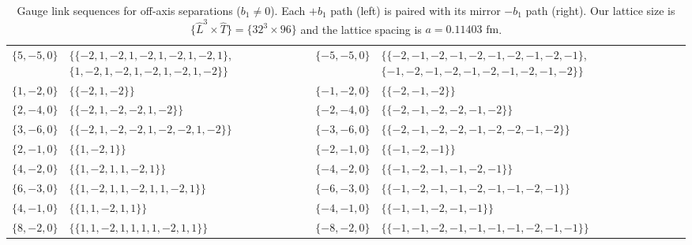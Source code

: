 \begin{table}[tb]
\begin{ruledtabular}
\begin{tabular}{llll}
$\{5,-5,0\}$ & \parbox[t]{0.32\textwidth}{\raggedright $\{$\mbox{$\{-2,1,-2,1,-2,1,-2,1,-2,1\}$}, \mbox{$\{1,-2,1,-2,1,-2,1,-2,1,-2\}$}$\}$} & $\{-5,-5,0\}$ & \parbox[t]{0.32\textwidth}{\raggedright $\{$\mbox{$\{-2,-1,-2,-1,-2,-1,-2,-1,-2,-1\}$}, \mbox{$\{-1,-2,-1,-2,-1,-2,-1,-2,-1,-2\}$}$\}$} \\
$\{1,-2,0\}$ & \parbox[t]{0.32\textwidth}{\raggedright $\{$\mbox{$\{-2,1,-2\}$}$\}$} & $\{-1,-2,0\}$ & \parbox[t]{0.32\textwidth}{\raggedright $\{$\mbox{$\{-2,-1,-2\}$}$\}$} \\
$\{2,-4,0\}$ & \parbox[t]{0.32\textwidth}{\raggedright $\{$\mbox{$\{-2,1,-2,-2,1,-2\}$}$\}$} & $\{-2,-4,0\}$ & \parbox[t]{0.32\textwidth}{\raggedright $\{$\mbox{$\{-2,-1,-2,-2,-1,-2\}$}$\}$} \\
$\{3,-6,0\}$ & \parbox[t]{0.32\textwidth}{\raggedright $\{$\mbox{$\{-2,1,-2,-2,1,-2,-2,1,-2\}$}$\}$} & $\{-3,-6,0\}$ & \parbox[t]{0.32\textwidth}{\raggedright $\{$\mbox{$\{-2,-1,-2,-2,-1,-2,-2,-1,-2\}$}$\}$} \\
$\{2,-1,0\}$ & \parbox[t]{0.32\textwidth}{\raggedright $\{$\mbox{$\{1,-2,1\}$}$\}$} & $\{-2,-1,0\}$ & \parbox[t]{0.32\textwidth}{\raggedright $\{$\mbox{$\{-1,-2,-1\}$}$\}$} \\
$\{4,-2,0\}$ & \parbox[t]{0.32\textwidth}{\raggedright $\{$\mbox{$\{1,-2,1,1,-2,1\}$}$\}$} & $\{-4,-2,0\}$ & \parbox[t]{0.32\textwidth}{\raggedright $\{$\mbox{$\{-1,-2,-1,-1,-2,-1\}$}$\}$} \\
$\{6,-3,0\}$ & \parbox[t]{0.32\textwidth}{\raggedright $\{$\mbox{$\{1,-2,1,1,-2,1,1,-2,1\}$}$\}$} & $\{-6,-3,0\}$ & \parbox[t]{0.32\textwidth}{\raggedright $\{$\mbox{$\{-1,-2,-1,-1,-2,-1,-1,-2,-1\}$}$\}$} \\
$\{4,-1,0\}$ & \parbox[t]{0.32\textwidth}{\raggedright $\{$\mbox{$\{1,1,-2,1,1\}$}$\}$} & $\{-4,-1,0\}$ & \parbox[t]{0.32\textwidth}{\raggedright $\{$\mbox{$\{-1,-1,-2,-1,-1\}$}$\}$} \\
$\{8,-2,0\}$ & \parbox[t]{0.32\textwidth}{\raggedright $\{$\mbox{$\{1,1,-2,1,1,1,1,-2,1,1\}$}$\}$} & $\{-8,-2,0\}$ & \parbox[t]{0.32\textwidth}{\raggedright $\{$\mbox{$\{-1,-1,-2,-1,-1,-1,-1,-2,-1,-1\}$}$\}$} \\
\end{tabular}
\end{ruledtabular}
        \caption{Gauge link sequences for off-axis separations ($b_1 \neq 0$). Each $+b_1$ path (left) is paired with its mirror $-b_1$ path (right). Our lattice size is $\{\hat{L}^3\times\hat{T}\}=\{32^3\times96\}$ and the lattice spacing is $a=0.11403\text{ fm}$.}
        \label{tab:b_table_offaxis}
\end{table}

